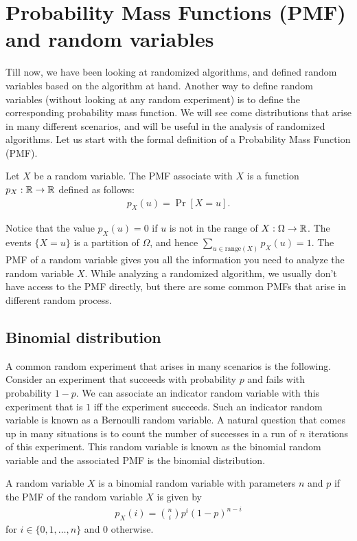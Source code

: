 \section{Probability Mass Functions (PMF) and random variables}

Till now, we have been looking at randomized algorithms, and defined random variables based on the algorithm at hand. Another way to define random variables (without looking at any random experiment) is to define the corresponding probability mass function. We will see come distributions that arise in many different scenarios, and will be useful in the analysis of randomized algorithms. Let us start with the formal definition of a Probability Mass Function (PMF).

\begin{definition}
	Let $X$ be a random variable. The PMF associate with $X$ is a function $p_X:\mathbb{R} \to \mathbb{R}$ defined as follows:
	\begin{align*}
		p_X(u) = \Pr[X=u].
	\end{align*}
	\label{defn:pmf}
\end{definition}

Notice that the value $p_X(u)=0$ if $u$ is not in the range of $X:\Omega \to \mathbb{R}$. The events $\{X = u\}$ is a partition of $\Omega$, and hence $\sum_{u \in \text{range}(X)} p_X(u) = 1$. The PMF of a random variable gives you all the information you need to analyze the random variable $X$. While analyzing a randomized algorithm, we usually don't have access to the PMF directly, but there are some common PMFs that arise in different random process. 

\subsection{Binomial distribution}

A common random experiment that arises in many scenarios is the following. Consider an experiment that succeeds with probability $p$ and fails with probability $1-p$. We can associate an indicator random variable with this experiment that is $1$ iff the experiment succeeds. Such an indicator random variable is known as a Bernoulli random variable. A natural question that comes up in many situations is to count the number of successes in a run of $n$ iterations of this experiment. This random variable is known as the binomial random variable and the associated PMF is the binomial distribution.

\begin{definition}
	A random variable $X$ is a binomial random variable with parameters $n$ and $p$ if the PMF of the random variable $X$ is given by 
	\begin{align*}
		p_X(i) = \binom{n}{i} p^i (1-p)^{n-i}
	\end{align*}
	for $i \in \{0,1,\ldots,n\}$ and $0$ otherwise.
	\label{defn:binomial}
\end{definition}

